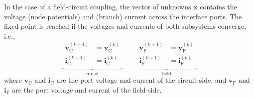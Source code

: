 In the case of a field-circuit coupling, the vector of unknowns $\mathbf{x}$ contains the voltage (node potentials) and (branch) current across the interface ports. The fixed point is reached if the voltages and currents of both subsystems converge, i.e.,
\begin{equation*}
    \underbrace{
        \begin{aligned}
            \mathbf{v}_{\text{C}}^{(k+1)} &= \mathbf{v}_{\text{C}}^{(k)} \\
            \mathbf{i}_{\text{C}}^{(k+1)} &= \mathbf{i}_{\text{C}}^{(k)}
        \end{aligned}
    }_{\text{circuit}}
    \qquad
    \underbrace{
        \begin{aligned}
            \mathbf{v}_{\text{F}}^{(k+1)} &= \mathbf{v}_{\text{F}}^{(k)} \\
            \mathbf{i}_{\text{F}}^{(k+1)} &= \mathbf{i}_{\text{F}}^{(k)}
        \end{aligned}
    }_{\text{field}}
\end{equation*}
where $\mathbf{v}_{\text{C}}$ and $\mathbf{i}_{\text{C}}$ are the port voltage and current of the circuit-side, and $\mathbf{v}_{\text{F}}$ and $\mathbf{i}_{\text{F}}$ are the port voltage and current of the field-side.

